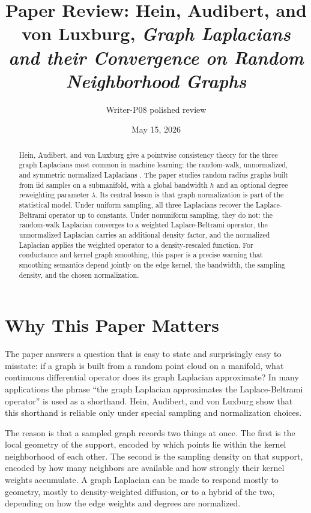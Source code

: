 \documentclass[11pt]{article}
\title{Paper Review: Hein, Audibert, and von Luxburg, \emph{Graph Laplacians and their Convergence on Random Neighborhood Graphs}}
\author{Writer-P08 polished review}
\date{May 15, 2026}
\begin{document}
\maketitle

\begin{abstract}
Hein, Audibert, and von Luxburg give a pointwise consistency theory for the
three graph Laplacians most common in machine learning: the random-walk,
unnormalized, and symmetric normalized Laplacians \citep{hein2007graph}.  The
paper studies random radius graphs built from iid samples on a submanifold,
with a global bandwidth $h$ and an optional degree reweighting parameter
$\lambda$.  Its central lesson is that graph normalization is part of the
statistical model.  Under uniform sampling, all three Laplacians recover the
Laplace-Beltrami operator up to constants.  Under nonuniform sampling, they
do not: the random-walk Laplacian converges to a weighted Laplace-Beltrami
operator, the unnormalized Laplacian carries an additional density factor,
and the normalized Laplacian applies the weighted operator to a
density-rescaled function.  For conductance and kernel graph smoothing, this
paper is a precise warning that smoothing semantics depend jointly on the
edge kernel, the bandwidth, the sampling density, and the chosen
normalization.
\end{abstract}

\section{Why This Paper Matters}

The paper answers a question that is easy to state and surprisingly easy to
misstate: if a graph is built from a random point cloud on a manifold, what
continuous differential operator does its graph Laplacian approximate?  In
many applications the phrase ``the graph Laplacian approximates the
Laplace-Beltrami operator'' is used as a shorthand.  Hein, Audibert, and von
Luxburg show that this shorthand is reliable only under special sampling and
normalization choices.

The reason is that a sampled graph records two things at once.  The first is
the local geometry of the support, encoded by which points lie within the
kernel neighborhood of each other.  The second is the sampling density on that
support, encoded by how many neighbors are available and how strongly their
kernel weights accumulate.  A graph Laplacian can be made to respond mostly
to geometry, mostly to density-weighted diffusion, or to a hybrid of the two,
depending on how the edge weights and degrees are normalized.
\end{document}
